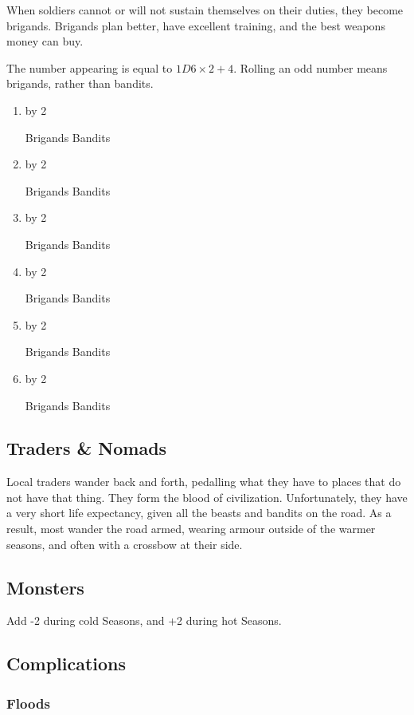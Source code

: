 \begin{multicols}{2}
When soldiers cannot or will not sustain themselves on their duties, they become brigands.
Brigands plan better, have excellent training, and the best weapons money can buy.

The number appearing is equal to $1D6\times 2 + 4$.
Rolling an odd number means brigands, rather than bandits.

\newcommand\showBandits{
  \item
  \setcounter{enc}{\value{enumi}}
  \multiply\value{enc} by 2
  \addtocounter{enc}{4}
  \arabic{enc} \ifodd\value{enumi}
    Brigands
  \else
    Bandits
  \fi
}

\begin{enumerate}
  \showBandits
  \showBandits
  \showBandits
  \showBandits
  \showBandits
  \showBandits
\end{enumerate}

\subsection{Traders \& Nomads}

Local traders wander back and forth, pedalling what they have to places that do not have that thing.
They form the blood of civilization.
Unfortunately, they have a very short life expectancy, given all the beasts and bandits on the road.
As a result, most wander the road armed, wearing armour outside of the warmer seasons, and often with a crossbow at their side.

\subsection{Monsters}

Add -2 during cold Seasons, and +2 during hot Seasons.

\begin{enumerate}
  \setcounter{enumi}{-2}
\end{enumerate}

\subsection{Complications}

\subsubsection{Floods}


\end{multicols}
